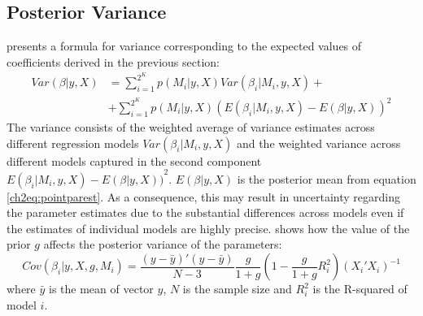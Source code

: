 \subsection{Posterior Variance}
\citet{MoralBenito2012} presents a formula for variance corresponding to the expected values of coefficients derived in the previous section:
\begin{equation}\label{ch2eq:postvar}
	\begin{aligned}
		Var(\beta \vert y, X) &= \sum_{i=1}^{2^{K}} p(M_{i} \vert y,X)Var(\beta_{i} \vert M_{i},y,X) + \\ 
		&+\sum_{i=1}^{2^{K}}p(M_{i} \vert y,X){(E(\beta_{i}\vert M_{i},y,X)-E(\beta \vert y, X))}^{2}
	\end{aligned}
\end{equation}
The variance consists of the weighted average of variance estimates across different regression models $Var(\beta_{i} \vert M_{i},y,X)$ and the weighted variance across different models captured in the second component ${{E(\beta_{i}\vert  M_{i},y,X)}-{E(\beta \vert y,X))}}^{2}$. $E(\beta \vert y,X)$ is the posterior mean from equation \ref{ch2eq:pointparest}. As a consequence, this may result in uncertainty regarding the parameter estimates due to the substantial differences across models even if the estimates of individual models are highly precise. \citet{Zeugner2011} shows how the value of the prior $g$ affects the posterior variance of the parameters:
%
\begin{equation}\label{ch2eq:postvarZ}
	Cov(\beta_{i}\vert y,X,g,M_{i}) = \frac{(y-\bar{y})'(y-\bar{y})}{N-3} \frac{g}{1+g} \left( 1- \frac{g}{1+g}R_{i}^{2} \right) (X_{i}'X_{i})^{-1}
\end{equation}
where $\bar{y}$ is the mean of vector $y$, $N$ is the sample size and $R^{2}_{i}$ is the R-squared of model $i$.
%
